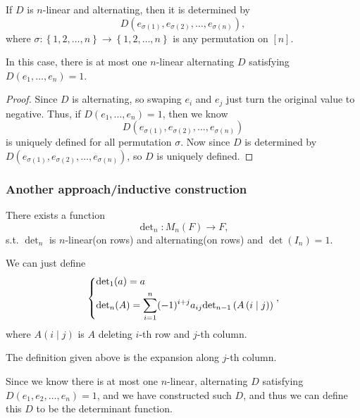 \begin{proposition}
    If \(D\) is \(n\)-linear and alternating, then it is determined by 
    \[
        D \left( e_{\sigma (1)}, e_{\sigma (2)}, \dots , e_{\sigma (n)} \right), 
    \] where \(\sigma : \left\{ 1, 2, \dots , n \right\} \to \left\{ 1, 2, \dots , n \right\}  \) is any permutation on \([n]\). 
\end{proposition}

\begin{remark}
    In this case, there is at most one \(n\)-linear alternating \(D\) satisfying \(D(e_1, \dots , e_n) = 1\).   
\end{remark}
\begin{proof}
    Since \(D\) is alternating, so swaping \(e_i\) and \(e_j\) just turn the original value to negative. Thus, if \(D(e_1, \dots , e_n) = 1\), then we know 
    \[
        D \left( e_{\sigma (1)}, e_{\sigma (2)}, \dots , e_{\sigma (n)} \right) 
    \] is uniquely defined for all permutation \(\sigma \). Now since \(D\) is determined by \(D \left( e_{\sigma (1)}, e_{\sigma (2)}, \dots , e_{\sigma (n)} \right) \), so \(D\) is uniquely defined.   
\end{proof}

\subsubsection{Another approach/inductive construction}
\begin{theorem}
    There exists a function
    \[
        \mathrm{\det }  _n: M_n(F) \to F,
    \]s.t. \(\det_n \) is \(n\)-linear(on rows) and alternating(on rows) and \(\det \left( I_n \right) = 1 \).   
\end{theorem}
We can just define 
\[
    \begin{dcases}
        \mathrm{\det }  _1 (a) = a \\
        \mathrm{\det }  _n(A) = \sum_{i=1}^n(-1)^{i+j} a_{ij} \mathrm{\det } _{n-1} \left( A \left( i \mid j \right)  \right)   
    \end{dcases}, 
\]where \(A(i \mid j)\) is \(A\) deleting \(i\)-th row and \(j\)-th column. 
\begin{note}
    The definition given above is the expansion along \(j\)-th column. 
\end{note}   

\begin{note}
    Since we know there is at most one \(n\)-linear, alternating \(D\) satisfying \(D(e_1, e_2, \dots , e_n) = 1\), and we have constructed such \(D\), and thus we can define this \(D\) to be the determinant function.     
\end{note}